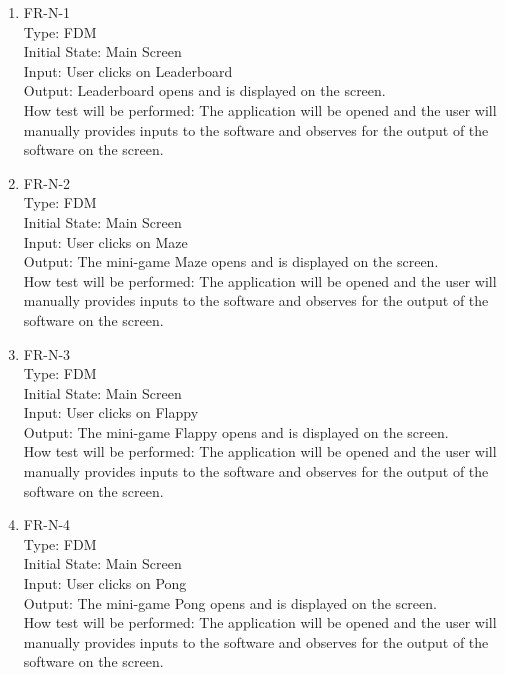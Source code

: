 \documentclass[12pt, titlepage]{article}
\begin{document}
\begin{enumerate}

\item{FR-N-1\\}
Type: FDM\\
Initial State: Main Screen\\
Input: User clicks on Leaderboard\\
Output: Leaderboard opens and is displayed on the screen.\\
How test will be performed: The application will be opened and the user will manually provides inputs to the software and observes for the output of the software on the screen.\\

\item{FR-N-2\\}
Type: FDM\\
Initial State: Main Screen\\
Input: User clicks on Maze\\
Output: The mini-game Maze opens and is displayed on the screen.\\
How test will be performed: The application will be opened and the user will manually provides inputs to the software and observes for the output of the software on the screen.\\

\item{FR-N-3\\}
Type: FDM\\
Initial State: Main Screen\\
Input: User clicks on Flappy\\
Output: The mini-game Flappy opens and is displayed on the screen.\\
How test will be performed: The application will be opened and the user will manually provides inputs to the software and observes for the output of the software on the screen.\\

\item{FR-N-4\\}
Type: FDM\\
Initial State: Main Screen\\
Input: User clicks on Pong\\
Output: The mini-game Pong opens and is displayed on the screen.\\
How test will be performed: The application will be opened and the user will manually provides inputs to the software and observes for the output of the software on the screen.\\


\end{enumerate}
\end{document}
